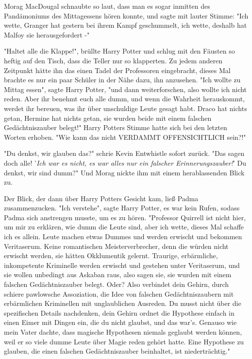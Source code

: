 {Morag MacDougal schnaubte so laut, dass man es sogar inmitten des Pandämoniums des Mittagessens hören konnte, und sagte mit lauter Stimme: "Ich wette, Granger hat gestern bei ihrem Kampf geschummelt, ich wette, deshalb hat Malfoy sie herausgefordert -"

"Haltet alle die Klappe!", brüllte Harry Potter und schlug mit den Fäusten so heftig auf den Tisch, dass die Teller nur so klapperten. Zu jedem anderen Zeitpunkt hätte ihn das einen Tadel der Professoren eingebracht, dieses Mal brachte es nur ein paar Schüler in der Nähe dazu, ihn anzusehen. "Ich wollte zu Mittag essen", sagte Harry Potter, "und dann weiterforschen, also wollte ich nicht reden. Aber ihr benehmt euch alle dumm, und wenn die Wahrheit herauskommt, werdet ihr bereuen, was ihr über unschuldige Leute gesagt habt. Draco hat nichts getan, Hermine hat nichts getan, sie wurden beide mit einem falschen Gedächtniszauber belegt!" Harry Potters Stimme hatte sich bei den letzten Worten erhoben. "Wie kann das nicht VERDAMMT OFFENSICHTLICH sein?!"

"Du denkst, wir glauben das?" schrie Kevin Entwhistle sofort zurück. "Das sagen doch alle! '\emph{Ich war es nicht, es war alles nur ein falscher Erinnerungszauber!}' Du denkst, wir sind dumm?" Und Morag nickte ihm mit einem herablassenden Blick zu.

Der Blick, der dann über Harry Potters Gesicht kam, ließ Padma zusammenzucken. "Ich verstehe", sagte Harry Potter, es war kein Rufen, sodass Padma sich anstrengen musste, um es zu hören. "Professor Quirrell ist nicht hier, um mir zu erklären, wie dumm die Leute sind, aber ich wette, dieses Mal schaffe ich es allein. Leute machen etwas Dummes und werden erwischt und bekommen Veritaserum. Keine romantischen Meisterverbrecher, denn die würden nicht erwischt werden, sie hätten Okklumentik gelernt. Traurige, erbärmliche, inkompetente Kriminelle werden erwischt und gestehen unter Veritaserum, und sie wollen unbedingt aus Askaban raus, also sagen sie, sie wurden mit einem falschen Gedächtniszauber belegt. Oder? Also verbindet dein Gehirn, durch schiere pawlowsche Assoziation, die Idee von falschen Gedächtniszaubern mit erbärmlichen Kriminellen mit unglaublichen Ausreden. Du musst nicht über die spezifischen Details nachdenken, dein Gehirn ordnet die Hypothese einfach in einen Eimer mit Dingen ein, die du nicht glaubst, und das war's. Genauso wie mein Vater dachte, dass magische Hypothesen niemals geglaubt werden können, weil er so viele dumme Leute über Magie reden gehört hatte. Eine Hypothese zu glauben, die einen falschen Gedächtniszauber beinhaltet, ist niederträchtig."

}
